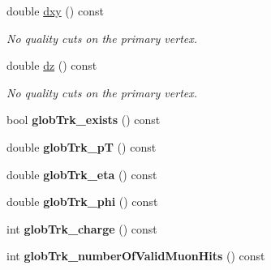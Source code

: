 \begin{DoxyCompactItemize}
\item 
\hypertarget{classran_1_1NtMuon_a16cac652ba76f04403bf90933be87626}{double \hyperlink{classran_1_1NtMuon_a16cac652ba76f04403bf90933be87626}{dxy} () const }\label{classran_1_1NtMuon_a16cac652ba76f04403bf90933be87626}

\begin{DoxyCompactList}\small\item\em No quality cuts on the primary vertex. \end{DoxyCompactList}\item 
\hypertarget{classran_1_1NtMuon_a4f501dcc23f456081607fa21f3041301}{double \hyperlink{classran_1_1NtMuon_a4f501dcc23f456081607fa21f3041301}{dz} () const }\label{classran_1_1NtMuon_a4f501dcc23f456081607fa21f3041301}

\begin{DoxyCompactList}\small\item\em No quality cuts on the primary vertex. \end{DoxyCompactList}\item 
\hypertarget{classran_1_1NtMuon_a54d3c69b891096a52ad73dce6346f22b}{bool {\bfseries glob\-Trk\-\_\-exists} () const }\label{classran_1_1NtMuon_a54d3c69b891096a52ad73dce6346f22b}

\item 
\hypertarget{classran_1_1NtMuon_a294f6cbd1342feca13b2afe9875187cf}{double {\bfseries glob\-Trk\-\_\-p\-T} () const }\label{classran_1_1NtMuon_a294f6cbd1342feca13b2afe9875187cf}

\item 
\hypertarget{classran_1_1NtMuon_a175afe8b4884fce3342f0d9ed0d21c4e}{double {\bfseries glob\-Trk\-\_\-eta} () const }\label{classran_1_1NtMuon_a175afe8b4884fce3342f0d9ed0d21c4e}

\item 
\hypertarget{classran_1_1NtMuon_abe59771bb167d0bc3a71281a9d47b6c9}{double {\bfseries glob\-Trk\-\_\-phi} () const }\label{classran_1_1NtMuon_abe59771bb167d0bc3a71281a9d47b6c9}

\item 
\hypertarget{classran_1_1NtMuon_ad8220bcf234147c246db60029c027f1e}{int {\bfseries glob\-Trk\-\_\-charge} () const }\label{classran_1_1NtMuon_ad8220bcf234147c246db60029c027f1e}

\item 
\hypertarget{classran_1_1NtMuon_a18290e4a76a4af9f18a99159e3a11f1d}{int {\bfseries glob\-Trk\-\_\-number\-Of\-Valid\-Muon\-Hits} () const }\label{classran_1_1NtMuon_a18290e4a76a4af9f18a99159e3a11f1d}


\end{DoxyCompactItemize}
